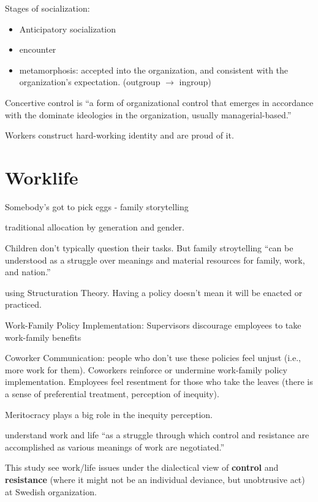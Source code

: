 \documentclass[
]{book}
\providecommand{\tightlist}{%
  \setlength{\itemsep}{0pt}\setlength{\parskip}{0pt}}
\begin{document}
Stages of socialization:

\begin{itemize}
\tightlist
\item
  Anticipatory socialization
\item
  encounter
\item
  metamorphosis: accepted into the organization, and consistent with the organization's expectation. (outgroup \(\to\)
  ingroup)
\end{itemize}

Concertive control is ``a form of organizational control that emerges in accordance with the dominate ideologies in the
organization, usually managerial-based.''

Workers construct hard-working identity and are proud of it.

\hypertarget{worklife}{%
\chapter{Worklife}\label{worklife}}

\citep{Langellier_2006} Somebody's got to pick eggs - family storytelling

traditional allocation by generation and gender.

Children don't typically question their tasks. But family stroytelling ``can be understood as a struggle over meanings
and material resources for family, work, and nation.''

\citep{Kirby_2002}

using \citep{gidden_1984} Structuration Theory. Having a policy doesn't mean it will be enacted or practiced.

Work-Family Policy Implementation: Supervisors discourage employees to take work-family benefits

Coworker Communication: people who don't use these policies feel unjust (i.e., more work for them). Coworkers reinforce
or undermine work-family policy implementation. Employees feel resentment for those who take the leaves (there is a
sense of preferential treatment, perception of inequity).

Meritocracy plays a big role in the inequity perception.

\citep{Wieland_2011}

understand work and life ``as a struggle through which control and resistance are accomplished as various meanings of
work are negotiated.''

This study see work/life issues under the dialectical view of \textbf{control} and \textbf{resistance} (where it might not be an
individual deviance, but unobtrusive act) at Swedish organization.
\end{document}
